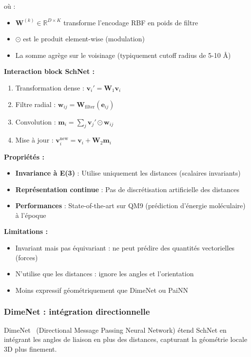où :
\begin{itemize}
    \item $\mathbf{W}^{(k)} \in \mathbb{R}^{D \times K}$ transforme l'encodage RBF en poids de filtre
    \item $\odot$ est le produit element-wise (modulation)
    \item La somme agrège sur le voisinage (typiquement cutoff radius de 5-10 Å)
\end{itemize}

\textbf{Interaction block SchNet :}
\begin{enumerate}
    \item Transformation dense : $\mathbf{v}_i' = \mathbf{W}_1 \mathbf{v}_i$
    \item Filtre radial : $\mathbf{w}_{ij} = \mathbf{W}_{\text{filter}}(\mathbf{e}_{ij})$
    \item Convolution : $\mathbf{m}_i = \sum_j \mathbf{v}_j' \odot \mathbf{w}_{ij}$
    \item Mise à jour : $\mathbf{v}_i^{\text{new}} = \mathbf{v}_i + \mathbf{W}_2 \mathbf{m}_i$
\end{enumerate}

\textbf{Propriétés :}
\begin{itemize}
    \item \textbf{Invariance à E(3)} : Utilise uniquement les distances (scalaires invariants)
    \item \textbf{Représentation continue} : Pas de discrétisation artificielle des distances
    \item \textbf{Performances} : State-of-the-art sur QM9 (prédiction d'énergie moléculaire) à l'époque
\end{itemize}

\textbf{Limitations :}
\begin{itemize}
    \item Invariant mais pas équivariant : ne peut prédire des quantités vectorielles (forces)
    \item N'utilise que les distances : ignore les angles et l'orientation
    \item Moins expressif géométriquement que DimeNet ou PaiNN
\end{itemize}

\subsubsection{DimeNet : intégration directionnelle}

DimeNet~\cite{Gasteiger2020} (Directional Message Passing Neural Network) étend SchNet en intégrant les angles de liaison en plus des distances, capturant la géométrie locale 3D plus finement.

